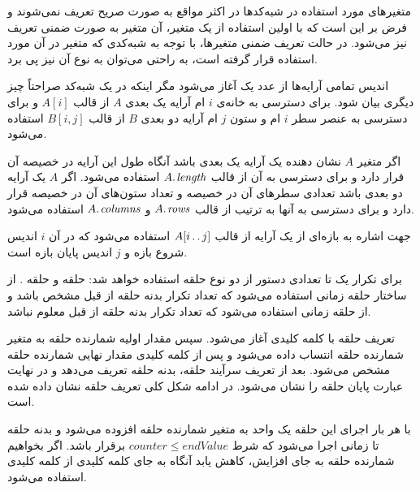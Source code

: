 متغیرهای مورد استفاده در شبه‌کد‌ها در اکثر مواقع به صورت صریح تعریف نمی‌شوند و فرض بر این است که با اولین استفاده از یک متغیر، آن متغیر به صورت ضمنی تعریف نیز می‌شود. در حالت تعریف ضمنی متغیرها، با توجه به شبه‌کدی که متغیر در آن مورد استفاده قرار گرفته است، به راحتی می‌توان به نوع آن نیز پی برد.

اندیس تمامی آرایه‌ها از عدد یک آغاز می‌شود مگر اینکه در یک شبه‌کد صراحتاً چیز دیگری بیان شود. برای دسترسی به خانه‌‌ی {$i$} ام آرایه یک بعدی {$A$} از قالب {$A[i]$} و برای دسترسی به عنصر سطر {$i$} ام و ستون {$j$} ام آرایه دو بعدی {$B$} از قالب {$B[i,j]$} استفاده می‌شود. 

اگر متغیر {$A$} نشان دهنده یک آرایه یک بعدی باشد آنگاه طول این آرایه در خصیصه {} آن قرار دارد و برای دسترسی به آن از قالب {$A.\hspace*{1pt}\mathit{length}$} استفاده می‌شود. اگر {$A$} یک آرایه دو بعدی باشد تعدادی سطرهای آن در خصیصه {} و تعداد ستون‌های آن در خصیصه {} قرار دارد و برای دسترسی به آنها به ترتیب از قالب {$A.\hspace*{1pt}\mathit{rows}$} و {$A.\hspace*{1pt}\mathit{columns}$} استفاده می‌شود. 

جهت اشاره به بازه‌ای از یک آرایه از قالب {$A[i\mathinner{\ldotp\ldotp} j]$} استفاده می‌شود که در آن {$i$} اندیس شروع بازه و {$j$} اندیس پایان بازه است.

برای تکرار یک تا تعدادی دستور از دو نوع حلقه استفاده خواهد شد: حلقه {} و حلقه {}. از ساختار حلقه {} زمانی استفاده می‌شود که تعداد تکرار بدنه حلقه از قبل مشخص باشد و از حلقه {} زمانی استفاده می‌شود که تعداد تکرار بدنه حلقه از قبل معلوم نباشد.

تعریف حلقه {} با کلمه کلیدی {} آغاز می‌شود. سپس مقدار اولیه شمارنده حلقه به متغیر شمارنده حلقه انتساب داده می‌شود و پس از کلمه کلیدی {} مقدار نهایی شمارنده حلقه مشخص می‌شود. بعد از تعریف سرآیند حلقه، بدنه حلقه تعریف می‌دهد و در نهایت عبارت {} پایان حلقه را نشان می‌شود. در ادامه شکل کلی تعریف حلقه {} نشان داده شده است.
\begin{latin}
\begin{algorithmic}[1]
	\State	{}
\EndFor
\end{algorithmic}
\end{latin}
با هر بار اجرای این حلقه یک واحد به متغیر شمارنده حلقه افزوده می‌شود و بدنه حلقه تا زمانی اجرا می‌شود که شرط {$\mathit{counter} \leqslant \mathit{endValue}$} برقرار باشد. اگر بخواهیم شمارنده حلقه به جای افزایش، کاهش یابد آنگاه به جای کلمه کلیدی {} از کلمه کلیدی {} استفاده می‌شود.

